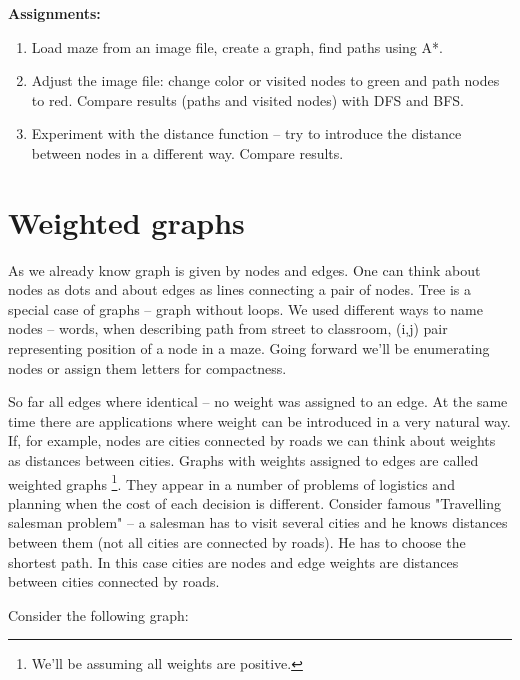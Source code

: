 \begin{tcolorbox}
\textbf{Assignments:}
\begin{enumerate}
\item Load maze from an image file, create a graph, find paths
using A*.
\item Adjust the image file: change color
or visited nodes to green and path nodes to red. Compare results 
(paths and visited nodes) with DFS and BFS.
\item Experiment with the distance function -- try to introduce
the distance between nodes in a different way. Compare results.
\end{enumerate}
\end{tcolorbox}


\section{Weighted graphs}

As we already know graph is given by nodes and edges. One can think
about nodes as dots and about edges as lines connecting
a pair of nodes. Tree is a special case of graphs -- graph without loops.
We used different ways to name nodes -- words, when describing
path from street to classroom, (i,j) pair representing
position of a node in a maze. Going forward we'll be
enumerating nodes or assign them letters for compactness.

So far all edges where identical -- no weight was assigned
to an edge. At the same time there are applications where
weight can be introduced in a very natural way. If, for example,
nodes are cities connected by roads we can think about weights
as distances between cities. Graphs with weights assigned to
edges are called weighted graphs \footnote{We'll be assuming
all weights are positive.}. They appear in a number of
problems of logistics and planning when the cost of
each decision is different. Consider famous
"Travelling salesman problem" -- a salesman has to visit
several cities and he knows distances between them (not all
cities are connected by roads). He has to choose the shortest path.
In this case cities are nodes and edge weights are distances
between cities connected by roads.

Consider the following graph:

\begin {center}
\end{center}


